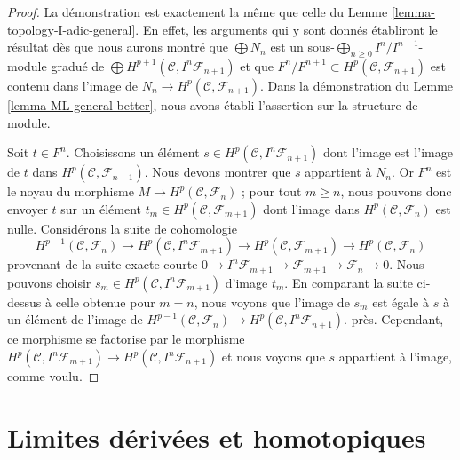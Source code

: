 \begin{proof}
La démonstration est exactement la même que celle du Lemme
\ref{lemma-topology-I-adic-general}. En effet, les arguments qui y sont
donnés établiront le résultat dès que nous aurons montré que
$\bigoplus N_n$ est un sous-$\bigoplus_{n \geq 0} I^n/I^{n + 1}$-module
gradué de $\bigoplus H^{p + 1}(\mathcal{C}, I^n\mathcal{F}_{n + 1})$ et que
$F^n/F^{n + 1} \subset H^p(\mathcal{C}, \mathcal{F}_{n + 1})$ est contenu
dans l'image de
$N_n \to H^p(\mathcal{C}, \mathcal{F}_{n + 1})$. Dans la démonstration du
Lemme \ref{lemma-ML-general-better}, nous avons établi l'assertion sur la
structure de module.

\medskip\noindent
Soit $t \in F^n$. Choisissons un élément
$s \in H^p(\mathcal{C}, I^n\mathcal{F}_{n + 1})$
dont l'image est l'image de $t$ dans
$H^p(\mathcal{C}, \mathcal{F}_{n + 1})$. Nous devons montrer que $s$
appartient à $N_n$. Or $F^n$ est le noyau du morphisme
$M \to H^p(\mathcal{C}, \mathcal{F}_n)$ ; pour tout $m \geq n$, nous
pouvons donc envoyer $t$ sur un élément
$t_m \in H^p(\mathcal{C}, \mathcal{F}_{m + 1})$ dont l'image dans
$H^p(\mathcal{C}, \mathcal{F}_n)$ est nulle. Considérons la suite de
cohomologie
$$
H^{p - 1}(\mathcal{C}, \mathcal{F}_n) \to
H^p(\mathcal{C}, I^n\mathcal{F}_{m + 1}) \to
H^p(\mathcal{C}, \mathcal{F}_{m + 1}) \to
H^p(\mathcal{C}, \mathcal{F}_n)
$$
provenant de la suite exacte courte
$0 \to I^n\mathcal{F}_{m + 1} \to \mathcal{F}_{m + 1} \to \mathcal{F}_n \to 0$.
Nous pouvons choisir
$s_m \in H^p(\mathcal{C}, I^n\mathcal{F}_{m + 1})$ d'image $t_m$. En
comparant la suite ci-dessus à celle obtenue pour $m = n$, nous voyons que
l'image de $s_m$ est égale à $s$ à un élément de l'image de
$H^{p - 1}(\mathcal{C}, \mathcal{F}_n) \to
H^p(\mathcal{C}, I^n\mathcal{F}_{n + 1})$.
près. Cependant, ce morphisme se factorise par le morphisme
$H^p(\mathcal{C}, I^n\mathcal{F}_{m + 1}) \to
H^p(\mathcal{C}, I^n\mathcal{F}_{n + 1})$
et nous voyons que $s$ appartient à l'image, comme voulu.
\end{proof}












\section{Limites dérivées et homotopiques}
\label{section-derived-limits}


